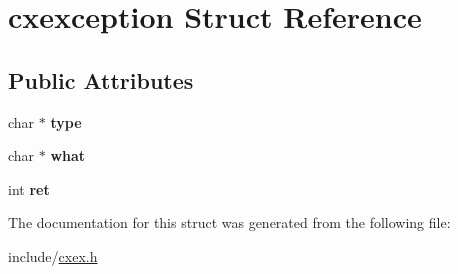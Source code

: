 \hypertarget{structcxexception}{}\section{cxexception Struct Reference}
\label{structcxexception}
\subsection*{Public Attributes}
\begin{DoxyCompactItemize}
\item 
\mbox{\label{structcxexception_a21a3264050c2a040698bc6f37487c633}} 
char $\ast$ {\bfseries type}
\item 
\mbox{\label{structcxexception_a81aa35ab48089d35437efb5351ec2243}} 
char $\ast$ {\bfseries what}
\item 
\mbox{\label{structcxexception_a58947b8f85613c5c0db0a78adc2035d1}} 
int {\bfseries ret}
\end{DoxyCompactItemize}


The documentation for this struct was generated from the following file\+:\begin{DoxyCompactItemize}
\item 
include/\hyperlink{cxex_8h}{cxex.\+h}\end{DoxyCompactItemize}
